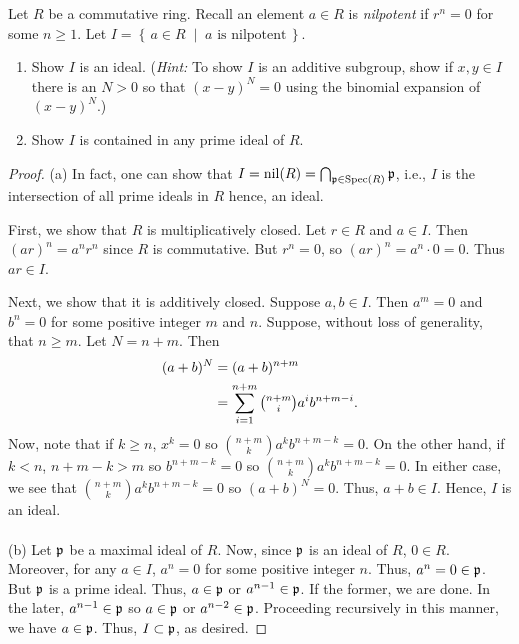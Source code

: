 \begin{problem}
Let $R$ be a commutative ring. Recall an element $a\in R$ is
\emph{nilpotent} if $r^n=0$ for some $n\geq 1$. Let $I=\left\{\,a\in
  R\;\middle|\;\text{$a$ is nilpotent}\,\right\}$.
\begin{enumerate}[label=(\alph*)]
\item Show $I$ is an ideal. (\emph{Hint:} To show $I$ is an additive
  subgroup, show if $x,y\in I$ there is an $N>0$ so that $(x-y)^N=0$ using
  the binomial expansion of $(x-y)^N$.)
\item Show $I$ is contained in any prime ideal of $R$.
\end{enumerate}
\end{problem}
\begin{proof}
(a) In fact, one can show that $I=\operatorname{nil}(R)=\bigcap_{\mathfrak{p}\in\operatorname{Spec}(R)}\mathfrak{p}$,
i.e., $I$ is the intersection of all prime ideals in $R$ hence, an ideal.

First, we show that $R$ is multiplicatively closed. Let $r\in R$ and $a\in
I$. Then $(ar)^n=a^nr^n$ since $R$ is commutative. But $r^n=0$, so
$(ar)^n=a^n\cdot 0=0$. Thus $ar\in I$.

Next, we show that it is additively closed. Suppose $a,b\in I$. Then
$a^m=0$ and $b^n=0$ for some positive integer $m$ and $n$. Suppose, without
loss of generality, that $n\geq m$. Let $N=n+m$. Then
\begin{align*}
(a+b)^N&=(a+b)^{n+m}\\
       &=\sum_{i=1}^{n+m}\tbinom{n+m}{i}a^ib^{n+m-i}.
\end{align*}
Now, note that if $k\geq n$, $x^k=0$ so $\binom{n+m}{k}a^kb^{n+m-k}=0$. On
the other hand, if $k<n$, $n+m-k>m$ so $b^{n+m-k}=0$ so
$\binom{n+m}{k}a^kb^{n+m-k}=0$. In either case, we see that
$\binom{n+m}{k}a^kb^{n+m-k}=0$ so $(a+b)^N=0$. Thus, $a+b\in I$. Hence,
$I$ is an ideal.
\\\\
(b) Let $\mathfrak{p}$ be a maximal ideal of $R$. Now, since $\mathfrak{p}$ is an ideal
of $R$, $0\in R$. Moreover, for any $a\in I$, $a^n=0$ for some positive
integer $n$. Thus, $a^n=0\in\mathfrak{p}$. But $\mathfrak{p}$ is a prime ideal. Thus,
$a\in\mathfrak{p}$ or $a^{n-1}\in\mathfrak{p}$. If the former, we are done. In the
later, $a^{n-1}\in\mathfrak{p}$ so $a\in\mathfrak{p}$ or $a^{n-2}\in\mathfrak{p}$. Proceeding
recursively in this manner, we have $a\in\mathfrak{p}$. Thus, $I\subset\mathfrak{p}$,
as desired.
\end{proof}

